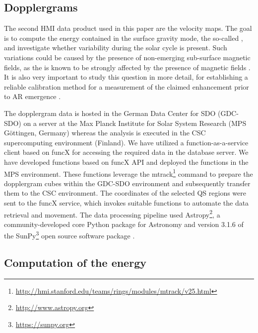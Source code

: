 \documentclass{aa}
\begin{document}

\subsection{Dopplergrams}

The second HMI data product used in this paper are the \los{} velocity maps. The goal is to compute the 
energy contained in the
surface gravity mode, the so-called \fffns,
and investigate whether variability during the solar cycle is present. Such variations could be caused by the presence of non-emerging sub-surface magnetic fields, as the \fff is known
to be strongly affected by the presence of magnetic fields \citep[see, e.g.,][]{Cally+94,CB97,SRB16}. 
It is also very important to study this question in more detail, for establishing a reliable calibration method 
for a measurement of
the claimed 
\fff enhancement prior to AR emergence \cite{SRB16,Waidele22}. 

The dopplergram data is hosted in the German Data Center for SDO (GDC-SDO) on a server at the Max Planck Institute for Solar System Research (MPS Göttingen, Germany) whereas the analysis is executed in the CSC supercomputing environment (Finland). We have utilized  a function-as-a-service client based on funcX \cite[]{chard20funcx} for accessing the required data in the database server. We have developed functions based on funcX API and deployed the functions in the MPS environment. These functions leverage the mtrack\footnote{\url{http://hmi.stanford.edu/teams/rings/modules/mtrack/v25.html}} command to prepare the dopplergram cubes within the GDC-SDO environment and subsequently transfer them to the CSC environment. The coordinates of the selected 
QS
regions were sent to the funcX service, which invokes suitable functions to automate the data retrieval and movement.
The data processing pipeline used Astropy\footnote{\url{http://www.astropy.org}}, a community-developed core Python package for Astronomy \citep{astropy13, astropy18} and version 3.1.6 of the SunPy\footnote{\url{https://sunpy.org}} open source software package \cite[]{sunpy20}.

\subsection{Computation of the \fff
energy}
\end{document}
